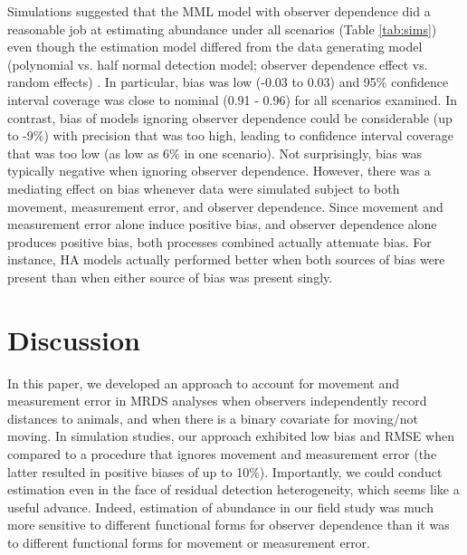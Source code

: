 \documentclass[12pt,fleqn]{article}
\begin{document}
Simulations suggested that the MML model with observer dependence did a reasonable job at estimating abundance under all scenarios (Table \ref{tab:sims}) even though the estimation model differed from the data generating model (polynomial vs. half normal detection model; observer dependence effect vs. random effects) .  In particular, bias was low (-0.03 to 0.03) and 95\% confidence interval coverage was close to nominal (0.91 - 0.96) for all scenarios examined.  In contrast, bias of models ignoring observer dependence could be considerable (up to -9\%) with precision that was too high, leading to confidence interval coverage that was too low (as low as 6\% in one scenario).  Not surprisingly, bias was typically negative when ignoring observer dependence. However, there was a mediating effect on bias whenever data were simulated subject to both movement, measurement error, and observer dependence.  Since movement and measurement error alone induce positive bias, and observer dependence alone produces positive bias, both processes combined actually attenuate bias. For instance, HA models actually performed better when both sources of bias were present than when either source of bias was present singly.



\section{Discussion}

In this paper, we developed an approach to account for movement and measurement error in MRDS analyses when observers independently record distances to animals, and when there is a binary covariate for moving/not moving. In simulation studies, our approach exhibited low bias and RMSE when compared to a procedure that ignores movement and measurement error (the latter resulted in positive biases of up to 10\%).  Importantly, we could conduct estimation even in the face of residual detection heterogeneity, which seems like a useful advance. Indeed, estimation of abundance in our field study was much more sensitive to different functional forms for observer dependence than it was to different functional forms for movement or measurement error.
\end{document}
